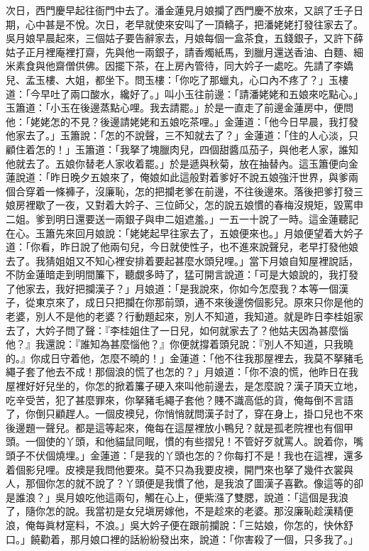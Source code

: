 次日，西門慶早起往衙門中去了。潘金蓮見月娘攔了西門慶不放來，又誤了壬子日期，{}心中甚是不悅。{}次日，老早就使來安叫了一頂轎子，把潘姥姥打發往家去了。{}吳月娘早晨起來，三個姑子要告辭家去，月娘每個一盒茶食，五錢銀子，又許下薛姑子正月裡庵裡打齋，先與他一兩銀子，請香燭紙馬，到臘月還送香油、白麵、細米素食與他齋僧供佛。因擺下茶，在上房內管待，同大妗子一處吃。先請了李嬌兒、孟玉樓、大姐，都坐下。問玉樓：「你吃了那蠟丸，心口內不疼了？」玉樓道：「今早吐了兩口酸水，纔好了。」叫小玉往前邊：「請潘姥姥和五娘來吃點心。」玉簫道：「小玉在後邊蒸點心哩。我去請罷。」{}於是一直走了前邊金蓮房中，便問他：「姥姥怎的不見？後邊請姥姥和五娘吃茶哩。」金蓮道：「他今日早晨，我打發他家去了。」玉簫說：「怎的不說聲，三不知就去了？」金蓮道：「住的人心淡，只顧住着怎的！」玉簫道：「我拏了塊臘肉兒，四個甜醬瓜茄子，與他老人家，誰知他就去了。五娘你替老人家收着罷。」於是遞與秋菊，放在抽替內。這玉簫便向金蓮說道：「昨日晚夕五娘來了，俺娘如此這般對着爹好不說五娘強汗世界，與爹兩個合穿着一條褲子，沒廉恥，怎的把攔老爹在前邊，不往後邊來。落後把爹打發三娘房裡歇了一夜，又對着大妗子、三位師父，怎的說五娘慣的春梅沒規矩，毀罵申二姐。爹到明日還要送一兩銀子與申二姐遮羞。」一五一十說了一時。這金蓮聽記在心。玉簫先來回月娘說：「姥姥起早往家去了，五娘便來也。」月娘便望着大妗子道：「你看，昨日說了他兩句兒，今日就使性子，也不進來說聲兒，老早打發他娘去了。我猜姐姐又不知心裡安排着要起甚麼水頭兒哩。」{}當下月娘自知屋裡說話，不防金蓮暗走到明間簾下，聽覷多時了，猛可開言說道：「可是大娘說的，我打發了他家去，我好把攔漢子？」月娘道：「是我說來，你如今怎麼我？本等一個漢子，從東京來了，成日只把攔在你那前頭，通不來後邊傍個影兒。原來只你是他的老婆，別人不是他的老婆？行動題起來，別人不知道，我知道。就是昨日李桂姐家去了，大妗子問了聲：『李桂姐住了一日兒，如何就家去了？他姑夫因為甚麼惱他？』我還說：『誰知為甚麼惱他？』你便就撐着頭兒說：『別人不知道，只我曉的。』{}你成日守着他，怎麼不曉的！」金蓮道：「他不往我那屋裡去，我莫不拏豬毛繩子套了他去不成！那個浪的慌了也怎的？」{}月娘道：「你不浪的慌，他昨日在我屋裡好好兒坐的，你怎的掀着簾子硬入來叫他前邊去，是怎麼說？漢子頂天立地，吃辛受苦，犯了甚麼罪來，你拏豬毛繩子套他？{}賤不識高低的貨，俺每倒不言語了，你倒只顧趕人。一個皮襖兒，你悄悄就問漢子討了，穿在身上，掛口兒也不來後邊題一聲兒。{}都是這等起來，俺每在這屋裡放小鴨兒？就是孤老院裡也有個甲頭。一個使的丫頭，和他貓鼠同眠，慣的有些摺兒！不管好歹就罵人。說着你，嘴頭子不伏個燒埋。」金蓮道：「是我的丫頭也怎的？你每打不是！我也在這裡，還多着個影兒哩。皮襖是我問他要來。莫不只為我要皮襖，開門來也拏了幾件衣裳與人，那個你怎的就不說了？{}丫頭便是我慣了他，是我浪了圖漢子喜歡。像這等的卻是誰浪？」吳月娘吃他這兩句，觸在心上，便紫漒了雙腮，說道：「這個是我浪了，隨你怎的說。我當初是女兒塡房嫁他，不是趁來的老婆。那沒廉恥趁漢精便浪，俺每眞材寔料，不浪。」{}吳大妗子便在跟前攔說：「三姑娘，你怎的，快休舒口。」饒勸着，那月娘口裡的話紛紛發出來，說道：「你害殺了一個，只多我了。」